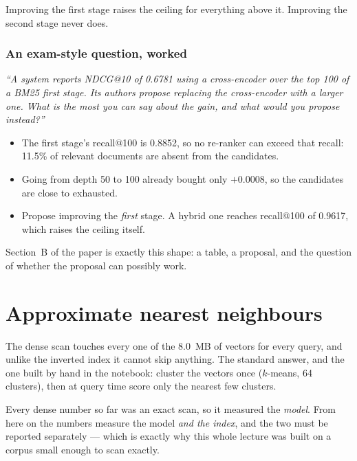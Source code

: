 \documentclass[11pt,a4paper]{article}
\begin{document}
\begin{keybox}[title={The most useful sentence in this lecture}]
Improving the first stage raises the ceiling for everything above it.
Improving the second stage never does.
\end{keybox}

\subsubsection{An exam-style question, worked}

\emph{``A system reports NDCG@10 of 0.6781 using a cross-encoder over the top
100 of a BM25 first stage. Its authors propose replacing the cross-encoder with
a larger one. What is the most you can say about the gain, and what would you
propose instead?''}

\begin{itemize}[leftmargin=*,nosep]
  \item The first stage's recall@100 is 0.8852, so no re-ranker can exceed that
        recall: 11.5\% of relevant documents are absent from the candidates.
  \item Going from depth 50 to 100 already bought only $+0.0008$, so the
        candidates are close to exhausted.
  \item Propose improving the \emph{first} stage. A hybrid one reaches
        recall@100 of 0.9617, which raises the ceiling itself.
\end{itemize}

Section~B of the paper is exactly this shape: a table, a proposal, and the
question of whether the proposal can possibly work.

\section{Approximate nearest neighbours}\label{sec:ann}

The dense scan touches every one of the 8.0~MB of vectors for every query, and
unlike the inverted index it cannot skip anything. The standard answer, and the
one built by hand in the notebook: cluster the vectors once ($k$-means, 64
clusters), then at query time score only the nearest few clusters.

\begin{keybox}[title={What this changes about the numbers}]
Every dense number so far was an exact scan, so it measured the \emph{model}.
From here on the numbers measure the model \emph{and the index}, and the two
must be reported separately --- which is exactly why this whole lecture was
built on a corpus small enough to scan exactly.
\end{keybox}
\end{document}
